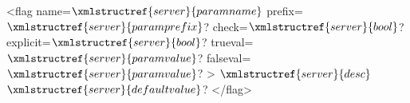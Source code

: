 <flag name=$\xmlstructref{server}{paramname}$ prefix=$\xmlstructref{server}{paramprefix}$? check=$\xmlstructref{server}{bool}$? 
     explicit=$\xmlstructref{server}{bool}$? trueval=$\xmlstructref{server}{paramvalue}$? falseval=$\xmlstructref{server}{paramvalue}$? >
  $\xmlstructref{server}{desc}$
  $\xmlstructref{server}{defaultvalue}$?
</flag>
